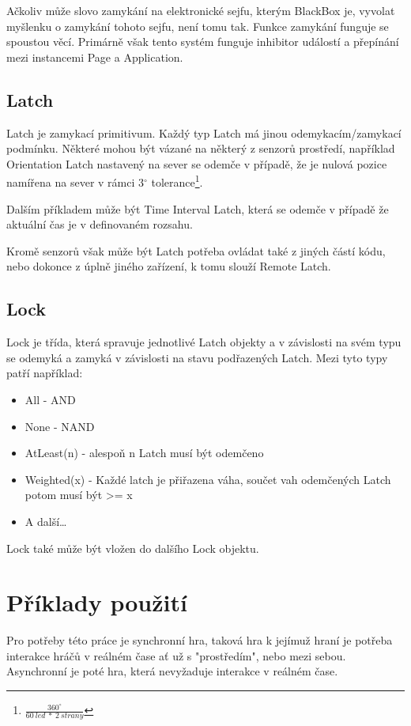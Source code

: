 Ačkoliv může slovo zamykání na elektronické sejfu, kterým BlackBox je, vyvolat myšlenku o zamykání tohoto sejfu, není tomu tak.
Funkce zamykání funguje se spoustou věcí.
Primárně však tento systém funguje inhibitor událostí a přepínání mezi instancemi Page a Application.

\subsection{Latch}
Latch je zamykací primitivum.
Každý typ Latch má jinou odemykacím/zamykací podmínku.
Některé mohou být vázané na některý z senzorů prostředí, například Orientation Latch nastavený na sever se odemče v případě, že je nulová pozice namířena na sever v rámci 3$^{\circ}$ tolerance\footnote{$\frac{360^{\circ}}{60~led~*~2~strany}$}.

Dalším příkladem může být Time Interval Latch, která se odemče v případě že aktuální čas je v definovaném rozsahu.

Kromě senzorů však může být Latch potřeba ovládat také z jiných částí kódu, nebo dokonce z úplně jiného zařízení, k tomu slouží Remote Latch.

\subsection{Lock}

Lock je třída, která spravuje jednotlivé Latch objekty a v závislosti na svém typu se odemyká a zamyká v závislosti na stavu podřazených Latch.
Mezi tyto typy patří například:
\begin{itemize}
    \item All - AND
    \item None - NAND
    \item AtLeast(n) - alespoň n Latch musí být odemčeno
    \item Weighted(x) - Každé latch je přiřazena váha, součet vah odemčených Latch potom musí být >= x
    \item A další\dots
\end{itemize}
Lock také může být vložen do dalšího Lock objektu.

\section{Příklady použití}

Pro potřeby této práce je synchronní hra, taková hra k jejímuž hraní je potřeba interakce hráčů v reálném čase ať už s "prostředím", nebo mezi sebou.
Asynchronní je poté hra, která nevyžaduje interakce v reálném čase.

